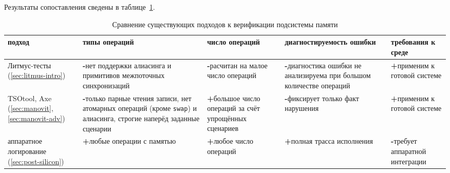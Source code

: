 Результаты сопоставления сведены в таблице~\ref{tab:ch1-comparison}.

\begin{table}[htbp]
  \caption{Сравнение существующих подходов к верификации подсистемы памяти}
  \label{tab:ch1-comparison}
  \centering
  \renewcommand{\arraystretch}{1.4}
  \begin{tabular}{|p{2.6cm}|p{3.2cm}|p{3.2cm}|p{3.2cm}|p{3.2cm}|}
    \hline
    \centering\textbf{подход} &
    \centering\textbf{типы операций} &
    \centering\textbf{число операций} &
    \centering\textbf{диагно\-сти\-ру\-е\-мость ошибки} &
    \centering\textbf{требования к среде}\arraybackslash \\
    \hline
    Литмус-тесты \newline (\ref{sec:litmus-intro}) &
    \textbf{\Large{-}}\newline нет поддержки алиасинга и примитивов
    межпоточных синхронизаций &
    \textbf{\Large{-}}\newline расчитан на малое число операций &
    \textbf{\Large{-}}\newline диагностика ошибки не анализируема при большом
    количестве операций &
    \textbf{\Large{+}}\newline применим к готовой системе \\
    \hline
    TSOtool, Axe \newline (\ref{sec:manovit},\ref{sec:manovit-adv}) &
    \textbf{\Large{-}}\newline только парные чтения записи, нет атомарных
    операций (кроме
    \texttt{swap}) и алиасинга, строгие наперёд заданные сценарии &
    \textbf{\Large{+}}\newline большое число операций за счёт
    упрощённых сценариев &
    \textbf{\Large{-}}\newline фиксирует только факт нарушения &
    \textbf{\Large{+}}\newline применим к готовой системе \\
    \hline
    аппаратное логирование \newline
    (\ref{sec:post-silicon}) &
    \textbf{\Large{+}}\newline любые операции с памятью &
    \textbf{\Large{+}}\newline любое число операций &
    \textbf{\Large{+}}\newline полная трасса исполнения &
    \textbf{\Large{-}}\newline требует аппаратной интеграции \\
    \hline
  \end{tabular}
\end{table}

